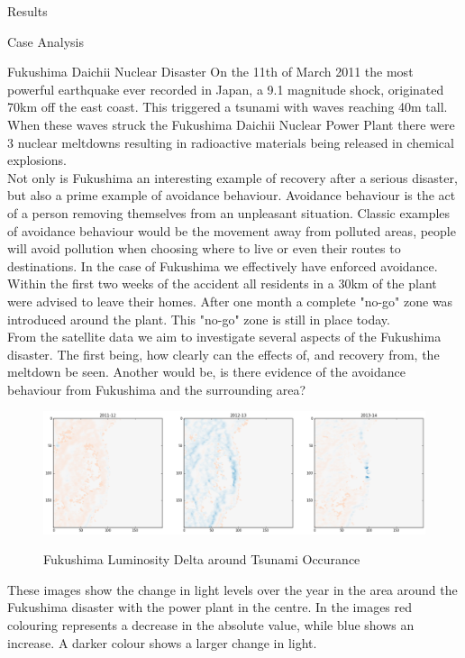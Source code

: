 \documentclass[12.5pt,fleqn,leqno,letterpaper]{article}
\begin{document}
\begin{section}{Results}
\begin{subsection}{Case Analysis}
    \begin{subsubsection}{Fukushima Daichii Nuclear Disaster}
      On the 11th of March 2011 the most powerful earthquake ever recorded in Japan, a 9.1 magnitude shock, originated 70km off the east coast. This triggered a tsunami with waves reaching 40m tall. When these waves struck the Fukushima Daichii Nuclear Power Plant there were 3 nuclear meltdowns resulting in radioactive materials being released in chemical explosions. \\
      Not only is Fukushima an interesting example of recovery after a serious disaster, but also a prime example of avoidance behaviour. Avoidance behaviour is the act of a person removing themselves from an unpleasant situation. Classic examples of avoidance behaviour would be the movement away from polluted areas, people will avoid pollution when choosing where to live or even their routes to destinations. In the case of Fukushima we effectively have enforced avoidance. Within the first two weeks of the accident all residents in a 30km of the plant were advised to leave their homes. After one month a complete "no-go" zone was introduced around the plant. This "no-go" zone is still in place today. \\
      From the satellite data we aim to investigate several aspects of the Fukushima disaster. The first being, how clearly can the effects of, and recovery from, the meltdown be seen. Another would be, is there evidence of the avoidance behaviour from Fukushima and the surrounding area? 
      \begin{figure}[H]
        \centering
        \includegraphics[width=1\linewidth]{fukushima}\label{fig:fukushima}
        \caption{Fukushima Luminosity Delta around Tsunami Occurance}
      \end{figure}
      These images show the change in light levels over the year in the area around the Fukushima disaster with the power plant in the centre. In the images red colouring represents a decrease in the absolute value, while blue shows an increase. A darker colour shows a larger change in light. \\

\end{subsubsection}
\end{subsection}
\end{section}
\end{document}
